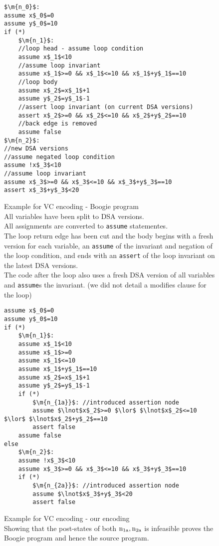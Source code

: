 \begin{figure}
\begin{lstlisting}
$\m{n_0}$:
assume x$_0$=0
assume y$_0$=10
if (*)
	$\m{n_1}$:
	//loop head - assume loop condition
	assume x$_1$<10
	//assume loop invariant
	assume x$_1$>=0 && x$_1$<=10 && x$_1$+y$_1$==10
	//loop body
	assume x$_2$=x$_1$+1
	assume y$_2$=y$_1$-1
	//assert loop invariant (on current DSA versions)
	assert x$_2$>=0 && x$_2$<=10 && x$_2$+y$_2$==10
	//back edge is removed
	assume false
$\m{n_2}$:
//new DSA versions
//assume negated loop condition
assume !x$_3$<10
//assume loop invariant
assume x$_3$>=0 && x$_3$<=10 && x$_3$+y$_3$==10
assert x$_3$+y$_3$<20
\end{lstlisting}
\caption{Example for VC encoding - Boogie program\\
All variables have been split to DSA versions.\\
All assignments are converted to \lstinline|assume| statementes.\\
The loop return edge has been cut and the body begins with a fresh version for each variable,
an \lstinline|assume| of the invariant and negation of the loop condition, 
and ends with an \lstinline|assert| of the loop invariant on the latest DSA versions.\\
The code after the loop also uses a fresh DSA version of all variables and \lstinline|assume|s the invariant.
(we did not detail a modifies clause for the loop)
}
\label{CFG_Boogie}
\end{figure}

\begin{figure}
\begin{lstlisting}
assume x$_0$=0
assume y$_0$=10
if (*)
	$\m{n_1}$:
	assume x$_1$<10
	assume x$_1$>=0 
	assume x$_1$<=10
	assume x$_1$+y$_1$==10
	assume x$_2$=x$_1$+1
	assume y$_2$=y$_1$-1
	if (*)
		$\m{n_{1a}}$: //introduced assertion node
		assume $\lnot$x$_2$>=0 $\lor$ $\lnot$x$_2$<=10 $\lor$ $\lnot$x$_2$+y$_2$==10
		assert false
	assume false
else
	$\m{n_2}$: 
	assume !x$_3$<10
	assume x$_3$>=0 && x$_3$<=10 && x$_3$+y$_3$==10
	if (*)
		$\m{n_{2a}}$: //introduced assertion node
		assume $\lnot$x$_3$+y$_3$<20
		assert false
\end{lstlisting}
\caption{Example for VC encoding - our encoding\\
Showing that the post-states of both $\mathrm{n_{1a},n_{2a}}$ is infeasible proves the Boogie program and hence the source program.
}
\label{CFG_ours}
\end{figure}

